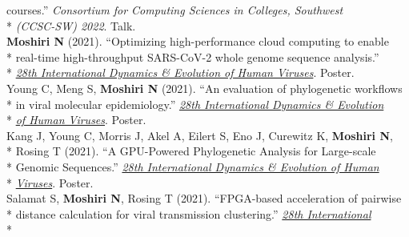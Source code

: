 \documentclass[margin,line]{res}
\begin{document}
\begin{resume}
\hspace*{9mm} courses.'' \textit{Consortium for Computing Sciences in Colleges, Southwest}\\*\vspace{2mm}
\hspace*{8mm} \textit{(CCSC-SW) 2022}. Talk.\\
\hspace*{4mm} \textbf{Moshiri N} (2021). ``Optimizing high-performance cloud computing to enable\\*
\hspace*{9mm} real-time high-throughput SARS-CoV-2 whole genome sequence analysis.''\\*\vspace{2mm}
\hspace*{8mm} \href{https://cpd.ucsd.edu/hivdynamics/}{\textit{28th International Dynamics \& Evolution of Human Viruses}}. Poster.\\
\hspace*{4mm} Young C, Meng S, \textbf{Moshiri N} (2021). ``An evaluation of phylogenetic workflows\\*
\hspace*{9mm} in viral molecular epidemiology.'' \href{https://cpd.ucsd.edu/hivdynamics/}{\textit{28th International Dynamics \& Evolution}}\\*\vspace{2mm}
\hspace*{8mm} \href{https://cpd.ucsd.edu/hivdynamics/}{\textit{of Human Viruses}}. Poster.\\
\hspace*{4mm} Kang J, Young C, Morris J, Akel A, Eilert S, Eno J, Curewitz K, \textbf{Moshiri N},\\*
\hspace*{9mm}  Rosing T (2021). ``A GPU-Powered Phylogenetic Analysis for Large-scale\\*
\hspace*{9.5mm} Genomic Sequences.'' \href{https://cpd.ucsd.edu/hivdynamics/}{\textit{28th International Dynamics \& Evolution of Human}}\\*\vspace{2mm}
\hspace*{7.5mm} \href{https://cpd.ucsd.edu/hivdynamics/}{\textit{Viruses}}. Poster.\\
\hspace*{4mm} Salamat S, \textbf{Moshiri N}, Rosing T (2021). ``FPGA-based acceleration of pairwise\\*
\hspace*{9mm} distance calculation for viral transmission clustering.'' \href{https://cpd.ucsd.edu/hivdynamics/}{\textit{28th International}}\\*\vspace{2mm}

\end{resume}
\end{document}
